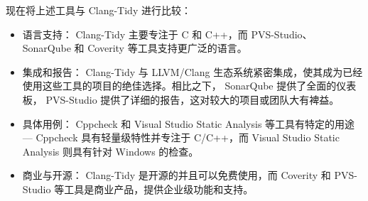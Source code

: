 
现在将上述工具与 Clang-Tidy 进行比较：

\begin{itemize}
\item
语言支持： Clang-Tidy 主要专注于 C 和 C++，而 PVS-Studio、 SonarQube 和 Coverity 等工具支持更广泛的语言。

\item
集成和报告： Clang-Tidy 与 LLVM/Clang 生态系统紧密集成，使其成为已经使用这些工具的项目的绝佳选择。相比之下， SonarQube 提供了全面的仪表板， PVS-Studio 提供了详细的报告，这对较大的项目或团队大有裨益。

\item
具体用例： Cppcheck 和 Visual Studio Static Analysis 等工具有特定的用途 --- Cppcheck 具有轻量级特性并专注于 C/C++，而 Visual Studio Static Analysis 则具有针对 Windows 的检查。

\item
商业与开源： Clang-Tidy 是开源的并且可以免费使用，而 Coverity 和 PVS-Studio 等工具是商业产品，提供企业级功能和支持。
\end{itemize}

















